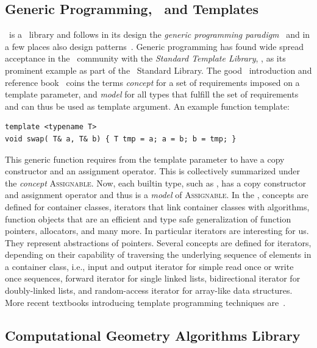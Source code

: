\subsection{Generic Programming, \CC\ and Templates}

\cgal\ is a \CC\ library and follows in its design the \emph{generic
programming paradigm\/}~\cite{cgal:ms-aogl-94,cgal:sl-stl-95} and in
a few places also design patterns~\cite{Gamma:1995:DP}. Generic
programming has found wide spread acceptance in the \CC\ community
with the \emph{Standard Template Library}, \stl, as its prominent
example as part of the \CC\ Standard Library. The good \stl\ 
introduction and reference book~\cite{cgal:a-gps-98} coins the terms
\emph{concept} for a set of requirements imposed on a template
parameter, and \emph{model\/} for all types that fulfill the set of
requirements and can thus be used as template argument. An example
function template:
\begin{lstlisting}
template <typename T>
void swap( T& a, T& b) { T tmp = a; a = b; b = tmp; }
\end{lstlisting}
This generic  function requires from the template
parameter  to have a copy constructor and an assignment
operator. This is collectively summarized under the \emph{concept\/}
\textsc{Assignable}. Now, each builtin type, such as \CodeFmt{double},
has a copy constructor and assignment operator and thus is a
\emph{model\/} of \textsc{Assignable}. In the \stl , concepts are
defined for container classes, iterators that link container classes
with algorithms, function objects that are an efficient and type safe
generalization of function pointers, allocators, and many more. In
particular iterators are interesting for us. They represent
abstractions of pointers. Several concepts are defined for iterators,
depending on their capability of traversing the underlying sequence of
elements in a container class, i.e., input and output iterator for
simple read once or write once sequences, forward iterator for single
linked lists, bidirectional iterator for doubly-linked lists, and
random-access iterator for array-like data structures. More recent
textbooks introducing template programming techniques
are~\cite{Alexandrescu:2001:MCD,cgal:vj-ctcg-03}.

\subsection{Computational Geometry Algorithms Library}

